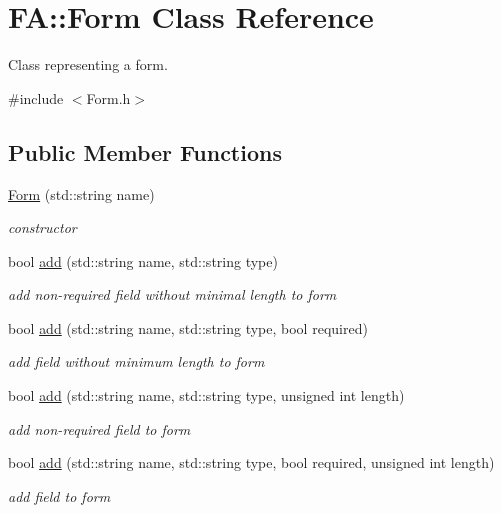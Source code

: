 \hypertarget{classFA_1_1Form}{\section{F\-A\-:\-:Form Class Reference}
\label{classFA_1_1Form}
}


Class representing a form.  




{\ttfamily \#include $<$Form.\-h$>$}

\subsection*{Public Member Functions}
\begin{DoxyCompactItemize}
\item 
\hyperlink{classFA_1_1Form_a91933b8204a67dcf14f1b6ac7092e84c}{Form} (std\-::string name)
\begin{DoxyCompactList}\small\item\em constructor \end{DoxyCompactList}\item 
bool \hyperlink{classFA_1_1Form_a1ead0d4f240193e7192ccd5c7e2d6023}{add} (std\-::string name, std\-::string type)
\begin{DoxyCompactList}\small\item\em add non-\/required field without minimal length to form \end{DoxyCompactList}\item 
bool \hyperlink{classFA_1_1Form_ad969a36c1cb318774b557d4cd50564ea}{add} (std\-::string name, std\-::string type, bool required)
\begin{DoxyCompactList}\small\item\em add field without minimum length to form \end{DoxyCompactList}\item 
bool \hyperlink{classFA_1_1Form_a819a4256afda2bebf784b93e8d69093f}{add} (std\-::string name, std\-::string type, unsigned int length)
\begin{DoxyCompactList}\small\item\em add non-\/required field to form \end{DoxyCompactList}\item 
bool \hyperlink{classFA_1_1Form_a1d0caba37f936d700d311621c9761293}{add} (std\-::string name, std\-::string type, bool required, unsigned int length)
\begin{DoxyCompactList}\small\item\em add field to form \end{DoxyCompactList}\item 

\end{DoxyCompactItemize}
